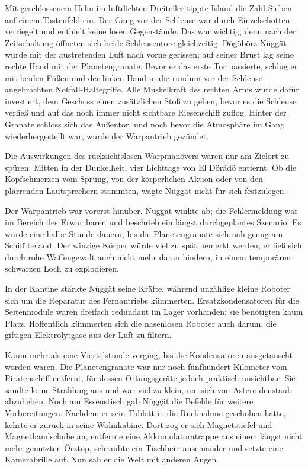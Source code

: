 Mit geschlossenem Helm im luftdichten Dreiteiler tippte Island die Zahl Sieben auf einem Tastenfeld ein. Der Gang vor der Schleuse war durch Einzelschotten verriegelt und enthielt keine losen Gegenstände. Das war wichtig, denn nach der Zeitschaltung öffneten sich beide Schleusentore gleichzeitig. Dögöbörz Nüggät wurde mit der austretenden Luft nach vorne gerissen; auf seiner Brust lag seine rechte Hand mit der Planetengranate. Bevor er das erste Tor passierte, schlug er mit beiden Füßen und der linken Hand in die rundum vor der Schleuse angebrachten Notfall-Haltegriffe. Alle Muskelkraft des rechten Arms wurde dafür investiert, dem Geschoss einen zusätzlichen Stoß zu geben, bevor es die Schleuse verließ und auf das noch immer nicht sichtbare Riesenschiff zuflog. Hinter der Granate schloss sich das Außentor, und noch bevor die Atmosphäre im Gang wiederhergestellt war, wurde der Warpantrieb gezündet.

Die Auswirkungen des rücksichtslosen Warpmanövers waren nur am Zielort zu spüren: Mitten in der Dunkelheit, vier Lichttage von El Dörädö entfernt. Ob die Kopfschmerzen vom Sprung, von der körperlichen Aktion oder von den plärrenden Lautsprechern stammten, wagte Nüggät nicht für sich festzulegen.


Der Warpantrieb war vorerst hinüber. Nüggät winkte ab; die Fehlermeldung war im Bereich des Erwartbaren und beschrieb ein längst durchgeplantes Szenario. Es würde eine halbe Stunde dauern, bis die Planetengranate sich nah genug am Schiff befand. Der winzige Körper würde viel zu spät bemerkt werden; er ließ sich durch rohe Waffengewalt auch nicht mehr daran hindern, in einem temporären schwarzen Loch zu explodieren.

In der Kantine stärkte Nüggät seine Kräfte, während unzählige kleine Roboter sich um die Reparatur des Fernantriebs kümmerten. Ersatzkondensatoren für die Seitenmodule waren dreifach redundant im Lager vorhanden; sie benötigten kaum Platz. Hoffentlich kümmerten sich die nasenlosen Roboter auch darum, die giftigen Elektrolytgase aus der Luft zu filtern.

Kaum mehr als eine Viertelstunde verging, bis die Kondensatoren ausgetauscht worden waren. Die Planetengranate war nur noch fünfhundert Kilometer vom Piratenschiff entfernt, für dessen Ortungsgeräte jedoch praktisch unsichtbar. Sie sandte keine Strahlung aus und war viel zu klein, um sich von Asteroidenstaub abzuheben. Noch am Essenstisch gab Nüggät die Befehle für weitere Vorbereitungen. Nachdem er sein Tablett in die Rücknahme geschoben hatte, kehrte er zurück in seine Wohnkabine. Dort zog er sich Magnetstiefel und Magnethandschuhe an, entfernte eine Akkumulatoratrappe aus einem längst nicht mehr genutzten Örztöp, schraubte ein Tischbein auseinander und setzte eine Kamerabrille auf. Nun sah er die Welt mit anderen Augen.

